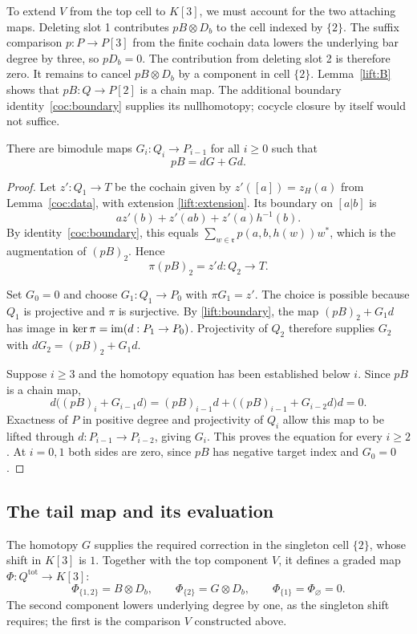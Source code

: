 To extend $V$ from the top cell to $K[3]$, we must account for the two
attaching maps.  Deleting slot 1 contributes $pB\otimes D_b$ to the
cell indexed by $\{2\}$.
The suffix comparison $p:P\to P[3]$ from the finite cochain data
lowers the underlying bar degree by three, so $pD_b=0$.
The contribution from deleting slot 2 is therefore zero.
It remains to cancel $pB\otimes D_b$ by a component in cell $\{2\}$.
Lemma~\ref{lift:B} shows that $pB:Q\to P[2]$ is a chain map.
The additional boundary identity~\eqref{coc:boundary} supplies its
nullhomotopy; cocycle closure by itself would not suffice.

\begin{lemma}
\label{lift:G}
There are bimodule maps $G_i:Q_i\to P_{i-1}$ for all $i\geq0$ such that
\[
 pB=dG+Gd.
\]
\end{lemma}
\begin{proof}
Let $z':Q_1\to T$ be the cochain given by $z'([a])=z_H(a)$ from
Lemma~\ref{coc:data}, with extension \eqref{lift:extension}.
Its boundary on $[a|b]$ is
\[
 az'(b)+z'(ab)+z'(a)h^{-1}(b).
\]
By identity~\eqref{coc:boundary}, this equals
$\sum_{w\in\mathfrak r}p(a,b,h(w))w^*$, which is the augmentation of
$(pB)_2$.  Hence
\begin{equation}
 \pi(pB)_2=z'd:Q_2\longrightarrow T.
 \label{lift:boundary}
\end{equation}

Set $G_0=0$ and choose $G_1:Q_1\to P_0$ with $\pi G_1=z'$.
The choice is possible because $Q_1$ is projective and $\pi$ is
surjective.  By \eqref{lift:boundary}, the map
$(pB)_2+G_1d$ has image in $\ker\pi=\operatorname{im}(d:P_1\to P_0)$.
Projectivity of $Q_2$ therefore supplies $G_2$ with
$dG_2=(pB)_2+G_1d$.

Suppose $i\geq3$ and the homotopy equation has been established below
$i$.  Since $pB$ is a chain map,
\[
 d\bigl((pB)_i+G_{i-1}d\bigr)
 =(pB)_{i-1}d+
       \bigl((pB)_{i-1}+G_{i-2}d\bigr)d=0.
\]
Exactness of $P$ in positive degree and projectivity of $Q_i$ allow
this map to be lifted through $d:P_{i-1}\to P_{i-2}$, giving $G_i$.
This proves the equation for every $i\geq2$.  At $i=0,1$ both sides
are zero, since $pB$ has negative target index and $G_0=0$.
\end{proof}

\subsection{The tail map and its evaluation}

The homotopy $G$ supplies the required correction in the singleton cell
$\{2\}$, whose shift in $K[3]$ is $1$.  Together with the top component
$V$, it defines a graded map $\Phi:Q^{\mathrm{tot}}\to K[3]$:
\begin{equation}
 \Phi_{\{1,2\}}=B\otimes D_b,\qquad
 \Phi_{\{2\}}=G\otimes D_b,\qquad
 \Phi_{\{1\}}=\Phi_{\varnothing}=0.
 \label{lift:tail}
\end{equation}
The second component lowers underlying degree by one, as the singleton
shift requires; the first is the comparison $V$ constructed above.

